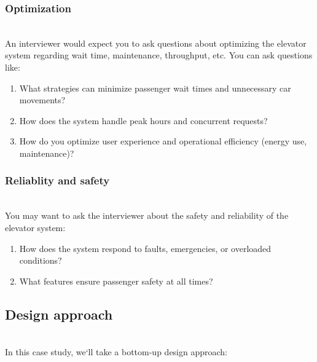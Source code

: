 \subsubsection{Optimization}\label{bUI00MJsoCldRJEfF3gOc}
\\
An interviewer would expect you to ask questions about optimizing the elevator system regarding wait time, maintenance, throughput, etc. You can ask questions like:

\begin{enumerate}
\item
\protect{}\label{CCV6iyNLbwSDKfwIE1iy-}
What strategies can minimize passenger wait times and unnecessary car movements?
\item
\protect{}\label{HHccu8hRUrVhLMarsjDO1}
How does the system handle peak hours and concurrent requests?
\item
\protect{}\label{joo42wPU-SUbw1hUxsu6E}
How do you optimize user experience and operational efficiency (energy use, maintenance)?
\end{enumerate}

\subsubsection{Reliablity and safety}\label{f1Wunzz89vPHSOpE-Jt0P}
\\
You may want to ask the interviewer about the safety and reliability of the elevator system:

\begin{enumerate}
\item
\protect{}\label{XN95nzHjDZqjHBXDVJX48}
How does the system respond to faults, emergencies, or overloaded conditions?
\item
\protect{}\label{-W4j5HgAl7MNaZF1sYSfF}
What features ensure passenger safety at all times?
\end{enumerate}

\subsection{Design approach}\label{lcLaxF82jBzm0oNdVfG7K}
\\
In this case study, we`ll take a bottom-up design approach:

